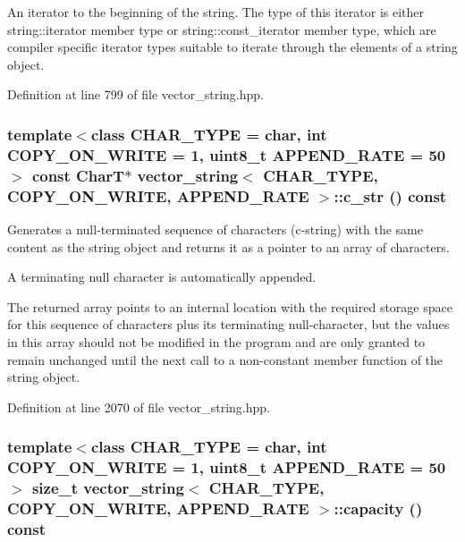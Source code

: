 An iterator to the beginning of the string. The type of this iterator is either string::iterator member type or string::const\_\-iterator member type, which are compiler specific iterator types suitable to iterate through the elements of a string object. 

Definition at line 799 of file vector\_\-string.hpp.\hypertarget{classvector__string_77c74227c7fe23929099157581a23fd3}{
\subsubsection[{c\_\-str}]{\setlength{\rightskip}{0pt plus 5cm}template$<$class CHAR\_\-TYPE  = char, int COPY\_\-ON\_\-WRITE = 1, uint8\_\-t APPEND\_\-RATE = 50$>$ const CharT$\ast$ {\bf vector\_\-string}$<$ CHAR\_\-TYPE, COPY\_\-ON\_\-WRITE, APPEND\_\-RATE $>$::c\_\-str () const}}
\label{classvector__string_77c74227c7fe23929099157581a23fd3}


Generates a null-terminated sequence of characters (c-string) with the same content as the string object and returns it as a pointer to an array of characters.

A terminating null character is automatically appended.

The returned array points to an internal location with the required storage space for this sequence of characters plus its terminating null-character, but the values in this array should not be modified in the program and are only granted to remain unchanged until the next call to a non-constant member function of the string object. 

Definition at line 2070 of file vector\_\-string.hpp.\hypertarget{classvector__string_0831bcf35fac1ef12692f7aade586f7b}{
\subsubsection[{capacity}]{\setlength{\rightskip}{0pt plus 5cm}template$<$class CHAR\_\-TYPE  = char, int COPY\_\-ON\_\-WRITE = 1, uint8\_\-t APPEND\_\-RATE = 50$>$ size\_\-t {\bf vector\_\-string}$<$ CHAR\_\-TYPE, COPY\_\-ON\_\-WRITE, APPEND\_\-RATE $>$::capacity () const}}
\label{classvector__string_0831bcf35fac1ef12692f7aade586f7b}


